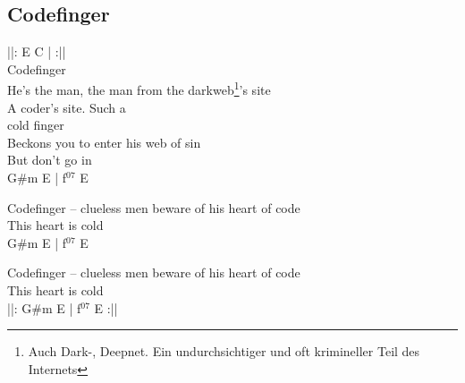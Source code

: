 \subsection{Codefinger}

\textcolor{\chordcolor}{||: E C | \hspace{0.8cm} :||}\\

Codefinger \\
He’s the man, the man from the darkweb\footnote{\scriptsize Auch Dark-, Deepnet. Ein undurchsichtiger und oft krimineller Teil des Internets}’s site \\
A coder’s site. \hspace{.4cm} Such a \\

cold finger \\
Beckons you to enter his web of sin \\
But don’t go in \\

\textcolor{\chordcolor}{G\#m E | f$^{07}$ E} \\


Codefinger -- clueless men beware of his heart of code \\
This heart is cold \\

\textcolor{\chordcolor}{G\#m E | f$^{07}$ E} \\


Codefinger -- clueless men beware of his heart of code \\
This heart is cold \\

\textcolor{\chordcolor}{||: G\#m E | f$^{07}$ E :||}\\


\pagebreak
